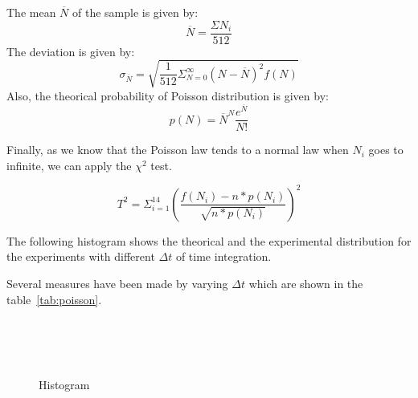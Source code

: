 \documentclass[a4paper,12pt,oneside]{article}
\begin{document}
The mean $\overline{N}$ of the sample is given by: $$\overline{N}=\frac{\Sigma N_i}{512}$$
The deviation is given by: $$\sigma_{\overline{N}}=\sqrt{\frac{1}{512}\Sigma^{\infty}_{N=0} (N-\overline{N})^2 f(N)}$$
Also, the theorical probability of Poisson distribution is given by: $$p(N)=\overline{N}^N \frac{e^{\overline{N}}}{N!}$$

Finally, as we know that the Poisson law tends to a normal law when $N_i$ goes to infinite, we can apply the $\chi^2$ test.

$$T^2=\Sigma^{14}_{i=1}{\left(\frac{f(N_i)-n*p(N_i)}{\sqrt{n*p(N_i)}}\right)^2}$$

The following histogram shows the theorical and the experimental distribution for the experiments with different $\Delta t$ of time integration.

Several measures have been made by varying $\Delta t$ which are shown in the table~\ref{tab:poisson}.

\begin{figure}[h!]
  \centering

  \\
  \\
  \\
  \label{figur}\caption{Histogram}
\end{figure}
\end{document}
